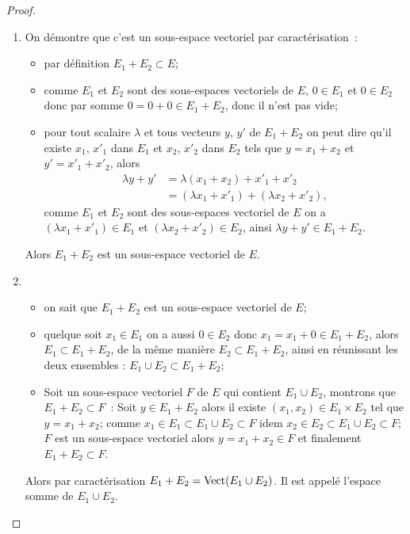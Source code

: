 \begin{proof}
  \begin{enumerate}
    \item On démontre que c'est un sous-espace vectoriel par caractérisation~:
      \begin{itemize}
        \item par définition \(E_1 + E_2 \subset E\);
        \item comme \(E_1\) et \(E_2\) sont des sous-espaces vectoriels de
          \(E\), \(0\in E_1\) et \(0 \in E_2\) donc par somme \(0=0+0 \in
          E_1+E_2\), donc il n'est pas vide;
        \item pour tout scalaire \(\lambda\) et tous vecteurs \(y\), \(y'\) de
          \(E_1+E_2\) on peut dire qu'il existe \(x_1\), \(x'_1\) dans \(E_1\)
          et \(x_2\), \(x'_2\) dans \(E_2\) tels que \(y=x_1+x_2\) et
          \(y'=x'_1+x'_2\), alors
          \begin{align}
            \lambda y + y' &= \lambda(x_1+x_2)+x'_1+x'_2 \\
            &=(\lambda x_1+x'_1)+(\lambda x_2+x'_2),
          \end{align}
          comme \(E_1\) et \(E_2\) sont des sous-espaces vectoriel de \(E\) on a
          \((\lambda x_1+x'_1) \in E_1\) et \((\lambda x_2+x'_2) \in E_2\),
          ainsi \(\lambda y + y' \in E_1+E_2\).
      \end{itemize}
      Alors \(E_1+E_2\) est un sous-espace vectoriel de \(E\).
    \item
      \begin{itemize}
        \item on sait que \(E_1+E_2\) est un sous-espace vectoriel de \(E\);
        \item quelque soit \(x_1 \in E_1\) on a aussi \(0 \in E_2\) donc
          \(x_1=x_1+0 \in E_1+E_2\), alors \(E_1 \subset E_1+E_2\), de la même
          manière \(E_2 \subset E_1+E_2\), ainsi en réunissant les deux
          ensembles : \(E_1 \cup E_2 \subset E_1+E_2\);
        \item Soit un sous-espace vectoriel \(F\) de \(E\) qui contient \(E_1
          \cup E_2\), montrons que \(E_1+E_2 \subset F\)~: Soit \(y \in
          E_1+E_2\) alors il existe \((x_1,x_2) \in E_1 \times E_2\) tel que
          \(y=x_1+x_2\); comme \(x_1 \in E_1 \subset E_1 \cup E_2  \subset F\)
          idem \(x_2 \in E_2 \subset E_1 \cup E_2  \subset F\); \(F\) est un
          sous-espace vectoriel alors \(y=x_1+x_2 \in F\) et finalement
          \(E_1+E_2 \subset F\).
      \end{itemize}
      Alors par caractérisation \(E_1+E_2=\operatorname{Vect}(E_1 \cup E_2)\). Il est
      appelé l'espace somme de \(E_1 \cup E_2\).
  \end{enumerate}
\end{proof}

